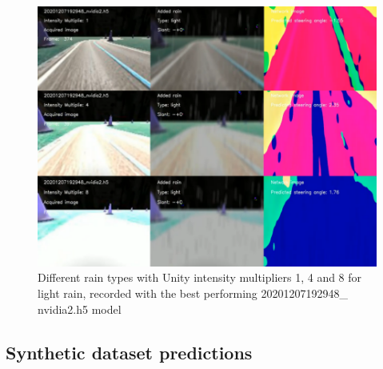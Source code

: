 \begin{figure}[ht]
 \centering 
 \includegraphics[width=\textwidth]{Figures/20201207192948_nvidia2_mult_1_4_8_light.png}
 \caption{Different rain types with Unity intensity multipliers 1, 4 and 8 for light rain, recorded with the best performing 20201207192948\_ nvidia2.h5 model}
 \label{fig:20201207192948_nvidia2_mult_1_4_8_light}
\end{figure}




\subsection{Synthetic dataset predictions}


